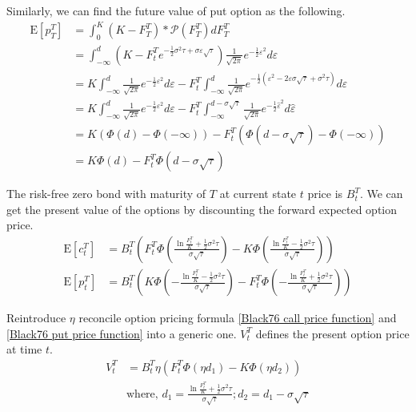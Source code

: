 \documentclass{article}
\begin{document}
Similarly, we can find the future value of put option as the following.
\begin{align}\label{Put option price derivation}
    \mathrm{E} \left[p_T^T \right] &= \int_{0}^{K} (K - F_T^T) * \mathcal{P}(F_T^T) d F_T^T \nonumber \\
    &= \int_{-\infty}^{d} (K - F_t^T e^{-\frac{1}{2} \sigma^2 \tau + \sigma \varepsilon \sqrt{\tau}}) \frac{1}{\sqrt{2 \pi}} e^{-\frac{1}{2} \varepsilon^2} d\varepsilon \nonumber \\
    &= K \int_{-\infty}^{d} \frac{1}{\sqrt{2 \pi}} e^{-\frac{1}{2} \varepsilon^2} d\varepsilon - F_t^T \int_{-\infty}^{d} \frac{1}{\sqrt{2 \pi}} e^{-\frac{1}{2} (\varepsilon^2 - 2 \varepsilon \sigma \sqrt{\tau} + \sigma^2 \tau)} d\varepsilon \nonumber \\
    &= K \int_{-\infty}^{d} \frac{1}{\sqrt{2 \pi}} e^{-\frac{1}{2} \varepsilon^2} d\varepsilon - F_t^T \int_{-\infty}^{d - \sigma \sqrt{\tau}} \frac{1}{\sqrt{2 \pi}} e^{-\frac{1}{2} \hat{\varepsilon}^2} d\hat{\varepsilon} \nonumber \\
    &= K (\Phi(d) - \Phi(-\infty)) - F_t^T (\Phi(d - \sigma \sqrt{\tau}) - \Phi(-\infty)) \nonumber \\
    &= K \Phi(d) - F_t^T \Phi(d - \sigma \sqrt{\tau})
\end{align}

The risk-free zero bond with maturity of $ T $ at current state $ t $ price is $ B_t^T $.
We can get the present value of the options by discounting the forward expected option price.
\begin{align}
    \mathrm{E} \left[c_t^T \right] &= B_t^T \left(F_t^T \Phi \left (\frac{\ln{\frac{F_t^T}{K}} + \frac{1}{2} \sigma^2 \tau}{\sigma \sqrt{\tau}} \right) - K \Phi \left (\frac{\ln{\frac{F_t^T}{K}} - \frac{1}{2} \sigma^2 \tau}{\sigma \sqrt{\tau}} \right)\right) \label{Black76 call price function} \\
    \mathrm{E} \left[p_t^T \right] &= B_t^T \left(K \Phi \left (-\frac{\ln{\frac{F_t^T}{K}} - \frac{1}{2} \sigma^2 \tau}{\sigma \sqrt{\tau}} \right) - F_t^T \Phi \left (-\frac{\ln{\frac{F_t^T}{K}} + \frac{1}{2} \sigma^2 \tau}{\sigma \sqrt{\tau}} \right) \right)\label{Black76 put price function}
\end{align}

Reintroduce $ \eta $ reconcile option pricing formula \ref{Black76 call price function} and \ref{Black76 put price function} into a generic one.
$ V_t^T $ defines the present option price at time $ t $.
\begin{align}\label{Black76 generic price function}
    V_t^T &= B_t^T \eta \left(F_t^T \Phi \left(\eta d_1 \right) - K \Phi \left(\eta d_2 \right) \right) \nonumber \\
    &\text{where, } d_1 = \frac{\ln{\frac{F_t^T}{K}} + \frac{1}{2} \sigma^2 \tau}{\sigma \sqrt{\tau}}; d_2 = d_1 - \sigma \sqrt{\tau}
\end{align}
\end{document}
